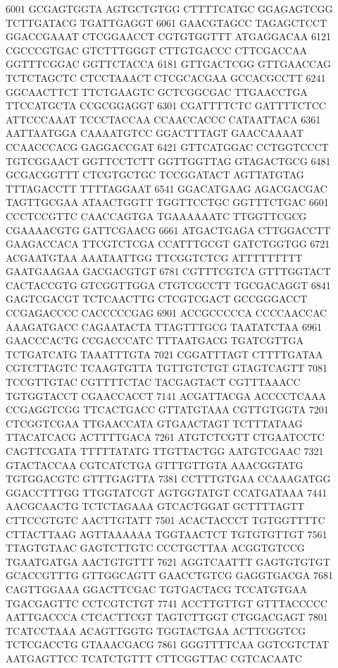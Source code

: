 \begin{addmargin}{0.1\textwidth}
\begin{footnotesize}
\begin{LVerbatim}[commandchars=\\\{\}]
\color{red}6001 GCGAGTGGTA AGTGCTGTGG CTTTTCATGC GGAGAGTCGG TCTTGATACG TGATTGAGGT 
\color{red}6061 GAACGTAGCC TAGAGCTCCT GGACCGAAAT CTCGGAACCT CGTGTGGTTT ATGAGGACAA 
\color{red}6121 CGCCCGTGAC GTCTTTGGGT CTTGTGACCC CTTCGACCAA GGTTTCGGAC GGTTCTACCA 
\color{red}6181 GTTGACTCGG GTTGAACCAG TCTCTAGCTC CTCCTAAACT CTCGCACGAA GCCACGCCTT 
\color{red}6241 GGCAACTTCT TTCTGAAGTC GCTCGGCGAC TTGAACCTGA TTCCATGCTA CCGCGGAGGT 
\color{red}6301 CGATTTTCTC GATTTTCTCC ATTCCCAAAT TCCCTACCAA CCAACCACCC CATAATTACA 
\color{red}6361 AATTAATGGA CAAAATGTCC GGACTTTAGT GAACCAAAAT CCAACCCACG GAGGACCGAT 
\color{red}6421 GTTCATGGAC CCTGGTCCCT TGTCGGAACT GGTTCCTCTT GGTTGGTTAG GTAGACTGCG 
\color{red}6481 GCGACGGTTT CTCGTGCTGC TCCGGATACT AGTTATGTAG TTTAGACCTT TTTTAGGAAT 
\color{red}6541 GGACATGAAG AGACGACGAC TAGTTGCGAA ATAACTGGTT TGGTTCCTGC GGTTTCTGAC 
\color{red}6601 CCCTCCGTTC CAACCAGTGA TGAAAAAATC TTGGTTCGCG CGAAAACGTG GATTCGAACG 
\color{red}6661 ATGACTGAGA CTTGGACCTT GAAGACCACA TTCGTCTCGA CCATTTGCGT GATCTGGTGG 
\color{red}6721 ACGAATGTAA AAATAATTGG TTCGGTCTCG ATTTTTTTTT GAATGAAGAA GACGACGTGT 
\color{red}6781 CGTTTCGTCA GTTTGGTACT CACTACCGTG GTCGGTTGGA CTGTCGCCTT TGCGACAGGT 
\color{red}6841 GAGTCGACGT TCTCAACTTG CTCGTCGACT GCCGGGACCT CCGAGACCCC CACCCCCGAG 
\color{red}6901 ACCGCCCCCA CCCCAACCAC AAAGATGACC CAGAATACTA TTAGTTTGCG TAATATCTAA 
\color{red}6961 GAACCCACTG CCGACCCATC TTTAATGACG TGATCGTTGA TCTGATCATG TAAATTTGTA 
\color{red}7021 CGGATTTAGT CTTTTGATAA CGTCTTAGTC TCAAGTGTTA TGTTGTCTGT GTAGTCAGTT 
\color{red}7081 TCCGTTGTAC CGTTTTCTAC TACGAGTACT CGTTTAAACC TGTGGTACCT CGAACCACCT 
\color{red}7141 ACGATTACGA ACCCCTCAAA CCGAGGTCGG TTCACTGACC GTTATGTAAA CGTTGTGGTA 
\color{red}7201 CTCGGTCGAA TTGAACCATA GTGAACTAGT TCTTTATAAG TTACATCACG ACTTTTGACA 
\color{red}7261 ATGTCTCGTT CTGAATCCTC CAGTTCGATA TTTTTATATG TTGTTACTGG AATGTCGAAC 
\color{red}7321 GTACTACCAA CGTCATCTGA GTTTGTTGTA AAACGGTATG TGTGGACGTC GTTTGAGTTA 
\color{red}7381 CCTTTGTGAA CCAAAGATGG GGACCTTTGG TTGGTATCGT AGTGGTATGT CCATGATAAA 
\color{red}7441 AACGCAACTG TCTCTAGAAA GTCACTGGAT GCTTTTAGTT CTTCCGTGTC AACTTGTATT 
\color{red}7501 ACACTACCCT TGTGGTTTTC CTTACTTAAG AGTTAAAAAA TGGTAACTCT TGTGTGTTGT 
\color{red}7561 TTAGTGTAAC GAGTCTTGTC CCCTGCTTAA ACGGTGTCCG TGAATGATGA AACTGTGTTT 
\color{red}7621 AGGTCAATTT GAGTGTGTGT GCACCGTTTG GTTGGCAGTT GAACCTGTCG GAGGTGACGA 
\color{red}7681 CAGTTGGAAA GGACTTCGAC TGTGACTACG TCCATGTGAA TGACGAGTTC CCTCGTCTGT 
\color{red}7741 ACCTTGTTGT GTTTACCCCC AATTGACCCA CTCACTTCGT TAGTCTTGGT CTGGACGAGT 
\color{red}7801 TCATCCTAAA ACAGTTGGTG TGGTACTGAA ACTTCGGTCG TCTCGACCTG GTAAACGACG 
\color{red}7861 GGGTTTTCAA GGTCGTCTAT AATGAGTTCC TCATCTGTTT CTTCGGTTAC CGTCACAATC 

\end{LVerbatim}
\end{footnotesize}
\end{addmargin}

